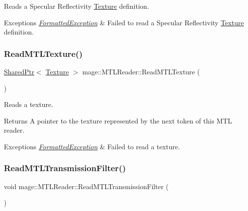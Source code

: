 Reads a Specular Reflectivity \hyperlink{classmage_1_1_texture}{Texture} definition.


\begin{DoxyExceptions}{Exceptions}
{\em \hyperlink{structmage_1_1_formatted_exception}{Formatted\+Exception}} & Failed to read a Specular Reflectivity \hyperlink{classmage_1_1_texture}{Texture} definition. \\
\hline
\end{DoxyExceptions}
\hypertarget{classmage_1_1_m_t_l_reader_a7ff401dab1b58709debff6cbe2c02d0c}{}\label{classmage_1_1_m_t_l_reader_a7ff401dab1b58709debff6cbe2c02d0c} 
\subsubsection{\texorpdfstring{Read\+M\+T\+L\+Texture()}{ReadMTLTexture()}}
{\footnotesize\ttfamily \hyperlink{namespacemage_a1e01ae66713838a7a67d30e44c67703e}{Shared\+Ptr}$<$ \hyperlink{classmage_1_1_texture}{Texture} $>$ mage\+::\+M\+T\+L\+Reader\+::\+Read\+M\+T\+L\+Texture (\begin{DoxyParamCaption}{ }\end{DoxyParamCaption})\hspace{0.3cm}{\ttfamily [private]}}

Reads a texture.

\begin{DoxyReturn}{Returns}
A pointer to the texture represented by the next token of this M\+TL reader. 
\end{DoxyReturn}

\begin{DoxyExceptions}{Exceptions}
{\em \hyperlink{structmage_1_1_formatted_exception}{Formatted\+Exception}} & Failed to read a texture. \\
\hline
\end{DoxyExceptions}
\hypertarget{classmage_1_1_m_t_l_reader_a4d5819606b5ea81862852587b2e1511b}{}\label{classmage_1_1_m_t_l_reader_a4d5819606b5ea81862852587b2e1511b} 
\subsubsection{\texorpdfstring{Read\+M\+T\+L\+Transmission\+Filter()}{ReadMTLTransmissionFilter()}}
{\footnotesize\ttfamily void mage\+::\+M\+T\+L\+Reader\+::\+Read\+M\+T\+L\+Transmission\+Filter (\begin{DoxyParamCaption}{ }\end{DoxyParamCaption})\hspace{0.3cm}{\ttfamily [private]}}

